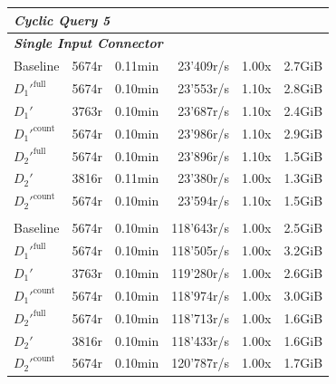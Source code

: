 \begin{longtable}{lrrrrr}
    \multicolumn{6}{l}{\textit{Cyclic Query 5}} \\
    \midrule
    \multicolumn{6}{l}{\textit{\textbf{Single Input Connector}}} \\
    \nopagebreak
    Baseline              &  5674r                &  0.11min            &  23'409r/s           & 1.00x             & 2.7GiB    \\
    $D_1'^{\text{full}}$   &  5674r                &  0.10min            &  23'553r/s           & 1.10x             & 2.8GiB    \\
    \quad $D_1'$           &  3763r                &  0.10min            &  23'687r/s           & 1.10x             & 2.4GiB    \\
    $D_1'^{\text{count}}$  &  5674r                &  0.10min            &  23'986r/s           & 1.10x             & 2.9GiB    \\
    $D_2'^{\text{full}}$   &  5674r                &  0.10min            &  23'896r/s           & 1.10x             & 1.5GiB    \\
    \quad $D_2'$           &  3816r                &  0.11min            &  23'380r/s           & 1.00x             & 1.3GiB    \\
    $D_2'^{\text{count}}$  &  5674r                &  0.10min            &  23'594r/s           & 1.10x             & 1.5GiB    \\
    \addlinespace 
    
    \multicolumn{6}{l}{\textit{\textbf{5 Input Connectors}}} \\
    \nopagebreak
    Baseline              &  5674r                &  0.10min            &  118'643r/s         & 1.00x             & 2.5GiB    \\
    $D_1'^{\text{full}}$   &  5674r                &  0.10min            &  118'505r/s         & 1.00x             & 3.2GiB    \\
    \quad $D_1'$           &  3763r                &  0.10min            &  119'280r/s         & 1.00x             & 2.6GiB    \\
    $D_1'^{\text{count}}$  &  5674r                &  0.10min            &  118'974r/s         & 1.00x             & 3.0GiB    \\
    $D_2'^{\text{full}}$   &  5674r                &  0.10min            &  118'713r/s         & 1.00x             & 1.6GiB    \\
    \quad $D_2'$           &  3816r                &  0.10min            &  118'433r/s         & 1.00x             & 1.6GiB    \\
    $D_2'^{\text{count}}$  &  5674r                &  0.10min            &  120'787r/s         & 1.00x             & 1.7GiB    \\
    \midrule
    

\end{longtable}
